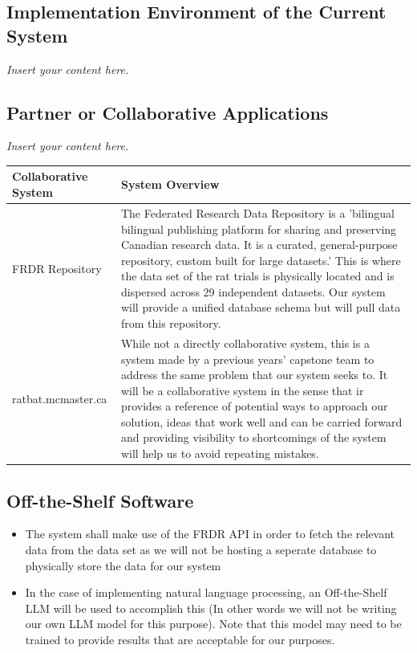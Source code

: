\documentclass[12pt]{article}
\newcommand{\lips}{\textit{Insert your content here.}}
\begin{document}
\subsection{Implementation Environment of the Current System}
\lips
\subsection{Partner or Collaborative Applications}
\lips

\begin{tabular}{|m{5cm}|m{10cm}|}
    \hline
    Collaborative System & System Overview \\
    \hline
    FRDR Repository & The Federated Research Data Repository is a 'bilingual bilingual publishing 
    platform for sharing and 
    preserving Canadian research data. 
    It is a curated, general-purpose repository, 
    custom built for large datasets.' This is where the data set of the rat trials is physically located
    and is dispersed across 29 independent datasets. Our system will provide a unified database schema but will
    pull data from this repository.\\
    \hline
    ratbat.mcmaster.ca & While not a directly collaborative system, this is a system made by a previous years' capstone
    team to address the same problem that our system seeks to. It will be a collaborative system in the sense that ir provides
    a reference of potential ways to approach our solution, ideas that work well and can be carried forward
    and providing visibility to shortcomings of the system will help us to avoid repeating mistakes. \\
    \hline
\end{tabular}

\subsection{Off-the-Shelf Software}

\begin{itemize}
    \item The system shall make use of the FRDR API in order to fetch the relevant data from the data set as we will not be hosting a seperate database to physically store the data for our system
    \item In the case of implementing natural language processing, an Off-the-Shelf LLM will be used to accomplish this (In other words we will not be writing our own LLM model for this purpose).
    Note that this model may need to be trained to provide results that are acceptable for our purposes.
\end{itemize}
\end{document}
